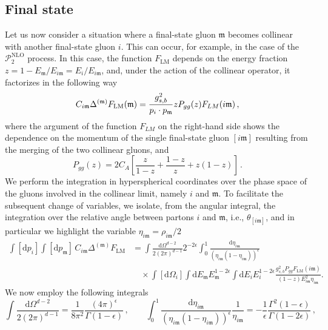 \documentclass[a4paper, 12pt]{book}
\newcommand{\um}{\mathfrak{m}}
\begin{document}
\subsection{Final state}
\label{final-state-section}
Let us now consider a situation where a final-state gluon $\um$ becomes collinear with another final-state gluon $i$. This can occur, for example, in the case of the $\mathcal{P}_2^{\mathrm{NLO}}$ process. In this case, the function $F_{\mathrm{LM}}$ depends on the energy fraction $z=1-E_\um/E_{i\um}=E_i/E_{i\um}$, and, under the action of the collinear operator, it factorizes in the following way
\begin{equation}
  C_{i \um} \Delta^{(\um)} F_{\mathrm{LM}} (\um) = \frac{g^2_{s,b}}{p_i \cdot p_\um} z P_{gg}(z) F_{\mathmakebox{LM}}(i\um)\, ,
  \label{collinear-factorization}
\end{equation}
where the argument of the function $F_{LM}$ on the right-hand side shows the dependence on the momentum of the single final-state gluon $[i\um]$ resulting from the merging of the two collinear gluons, and
\begin{equation}
  P_{gg}(z)= 2C_A \left[ \frac{z}{1-z}+\frac{1-z}{z}+z(1-z)\right] \, .
\end{equation}
We perform the integration in hyperspherical coordinates over the phase space of the gluons involved in the collinear limit, namely $i$ and $\um$. To facilitate the subsequent change of variables, we isolate, from the angular integral, the integration over the relative angle between partons $i$ and $\um$, i.e., $\theta_{[i\um]}$, and in particular we highlight the variable $\eta_{i\um}=\rho_{i\um}/2$
\begin{align}
  \int [\mathrm{d}p_i] \int [\mathrm{d}p_\um] \, C_{i\um} \Delta^{(\um)} F_{\mathrm{LM}} 
  &= \int \frac{\mathrm{d}\Omega^{d-2}}{2(2\pi)^{d-1}} 2^{-2\epsilon} \int_0^1 \frac{\mathrm{d}\eta_{i\um}}{(\eta_{i\um}(1-\eta_{i\um}))^{\epsilon}} \nonumber \\
  &\quad \times \int [\mathrm{d}\Omega_i] \int \mathrm{d}E_\um E_\um^{1-2\epsilon} \int \mathrm{d}E_i E_i^{1-2\epsilon} 
  \frac{g_{s,b}^2 P_{gg} F_{\mathrm{LM}} (i\um) }{(1-z) E_{i\um}^{2}\eta_{i\um}} .
\end{align}
We now employ the following integrals
\begin{equation}
  \int \frac{\mathrm{d}\Omega^{d-2}}{2(2\pi)^{d-1}} = \frac{1}{8\pi^2} \frac{(4\pi)^{\epsilon}}{\Gamma(1-\epsilon)} \, , \qquad \int_0^1 \frac{\mathrm{d}\eta_{i\um}}{(\eta_{i\um}(1-\eta_{i\um}))^{\epsilon}} \frac{1}{\eta_{i\um}} = - \frac{1}{\epsilon} \frac{\Gamma^2(1-\epsilon)}{\Gamma(1-2\epsilon)} \, , 
\end{equation}
\end{document}
